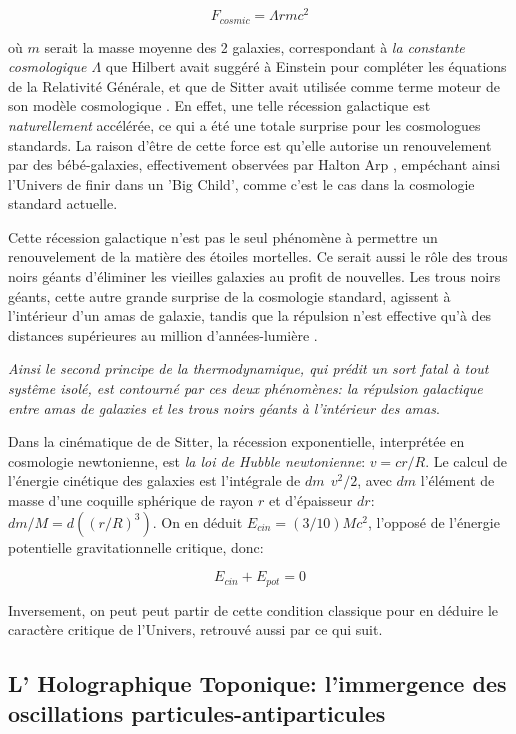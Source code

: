\documentclass[a4paper,9pt]{article}
\begin{document}
\begin{equation}
F_{cosmic} = \Lambda r mc^2
\end{equation}

où $m$ serait la masse moyenne des 2 galaxies, correspondant à \textit{la constante cosmologique $\Lambda$} que Hilbert avait suggéré à Einstein pour compléter les équations de la Relativité Générale, et que de Sitter avait utilisée comme terme moteur de son modèle cosmologique \cite{deSitter}. En effet, une telle récession galactique est \textit{naturellement} accélérée, ce qui a été une totale surprise pour les cosmologues standards. La raison d'être de cette force est qu'elle autorise un renouvelement par des bébé-galaxies, effectivement observées par Halton Arp \cite{Arp}, empéchant ainsi l'Univers de finir dans un 'Big Child', comme c'est le cas dans la cosmologie standard actuelle.

Cette récession galactique n'est pas le seul phénomène à permettre un renouvelement de la matière des étoiles mortelles. Ce serait aussi le rôle des trous noirs géants d'éliminer les vieilles galaxies au profit de nouvelles. Les trous noirs géants, cette autre grande surprise de la cosmologie standard, agissent à l'intérieur d'un amas de galaxie, tandis que la répulsion n'est effective qu'à des distances supérieures au million d'années-lumière \cite{Sanchez2}.

\textit{Ainsi le second principe de la thermodynamique, qui prédit un sort fatal à tout systême isolé, est contourné par ces deux phénomènes: la répulsion galactique entre amas de galaxies et les trous noirs géants à l'intérieur des amas}.

Dans la cinématique de de Sitter, la récession exponentielle, interprétée en cosmologie newtonienne, est \textit{la loi de Hubble newtonienne}: $v = cr/R$. Le calcul de l'énergie cinétique des galaxies est l'intégrale de $dm ~~ v^2/2$, avec $dm$ l'élément de masse d'une coquille sphérique de rayon $r$ et d'épaisseur $dr$: $dm/M = d((r/R)^3)$. On en déduit $E_{cin} = (3/10)Mc^2$, l'opposé de l'énergie potentielle gravitationnelle critique, donc:

\begin{equation}
E_{cin}+ E_{pot} = 0
\end{equation}

Inversement, on peut peut partir de cette condition classique pour en déduire le caractère critique de l'Univers, retrouvé aussi par ce qui suit.

\subsection{L' Holographique Toponique: l'immergence des oscillations particules-antiparticules}
\end{document}
